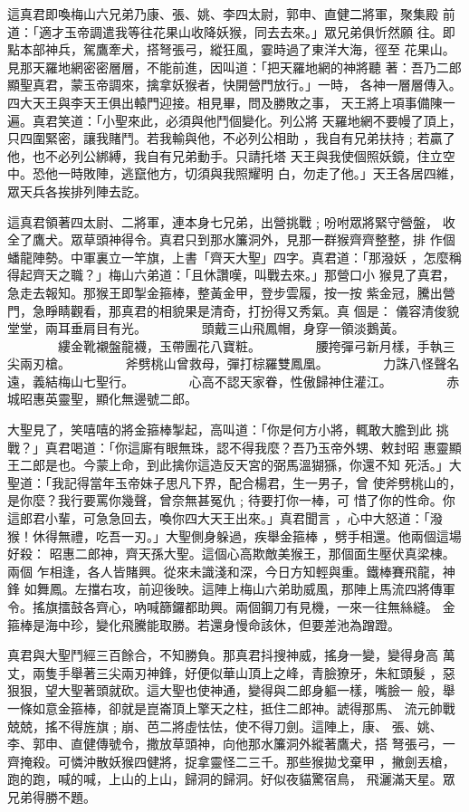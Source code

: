 \begin{pinyinscope}
{這真君即喚梅山六兄弟乃康、張、姚、李四太尉，郭申、直健二將軍，聚集殿
前道：「適才玉帝調遣我等往花果山收降妖猴，同去去來。」眾兄弟俱忻然願
往。即點本部神兵，駕鷹牽犬，搭弩張弓，縱狂風，霎時過了東洋大海，徑至
花果山。見那天羅地網密密層層，不能前進，因叫道：「把天羅地網的神將聽
著：吾乃二郎顯聖真君，蒙玉帝調來，擒拿妖猴者，快開營門放行。」一時，
各神一層層傳入。四大天王與李天王俱出轅門迎接。相見畢，問及勝敗之事，
天王將上項事備陳一遍。真君笑道：「小聖來此，必須與他鬥個變化。列公將
天羅地網不要幔了頂上，只四圍緊密，讓我賭鬥。若我輸與他，不必列公相助
，我自有兄弟扶持﹔若贏了他，也不必列公綁縛，我自有兄弟動手。只請托塔
天王與我使個照妖鏡，住立空中。恐他一時敗陣，逃竄他方，切須與我照耀明
白，勿走了他。」天王各居四維，眾天兵各挨排列陣去訖。

這真君領著四太尉、二將軍，連本身七兄弟，出營挑戰﹔吩咐眾將緊守營盤，
收全了鷹犬。眾草頭神得令。真君只到那水簾洞外，見那一群猴齊齊整整，排
作個蟠龍陣勢。中軍裏立一竿旗，上書「齊天大聖」四字。真君道：「那潑妖
，怎麼稱得起齊天之職？」梅山六弟道：「且休讚嘆，叫戰去來。」那營口小
猴見了真君，急走去報知。那猴王即掣金箍棒，整黃金甲，登步雲履，按一按
紫金冠，騰出營門，急睜睛觀看，那真君的相貌果是清奇，打扮得又秀氣。真
個是：
儀容清俊貌堂堂，兩耳垂肩目有光。
　　　　頭戴三山飛鳳帽，身穿一領淡鵝黃。
　　　　縷金靴襯盤龍襪，玉帶團花八寶粧。
　　　　腰挎彈弓新月樣，手執三尖兩刃槍。
　　　　斧劈桃山曾救母，彈打棕羅雙鳳凰。
　　　　力誅八怪聲名遠，義結梅山七聖行。
　　　　心高不認天家眷，性傲歸神住灌江。
　　　　赤城昭惠英靈聖，顯化無邊號二郎。

大聖見了，笑嘻嘻的將金箍棒掣起，高叫道：「你是何方小將，輒敢大膽到此
挑戰？」真君喝道：「你這廝有眼無珠，認不得我麼？吾乃玉帝外甥、敕封昭
惠靈顯王二郎是也。今蒙上命，到此擒你這造反天宮的弼馬溫猢猻，你還不知
死活。」大聖道：「我記得當年玉帝妹子思凡下界，配合楊君，生一男子，曾
使斧劈桃山的，是你麼？我行要罵你幾聲，曾奈無甚冤仇﹔待要打你一棒，可
惜了你的性命。你這郎君小輩，可急急回去，喚你四大天王出來。」真君聞言
，心中大怒道：「潑猴！休得無禮，吃吾一刃。」大聖側身躲過，疾舉金箍棒
，劈手相還。他兩個這場好殺：
昭惠二郎神，齊天孫大聖。這個心高欺敵美猴王，那個面生壓伏真梁棟。兩個
乍相逢，各人皆賭興。從來未識淺和深，今日方知輕與重。鐵棒賽飛龍，神鋒
如舞鳳。左擋右攻，前迎後映。這陣上梅山六弟助威風，那陣上馬流四將傳軍
令。搖旗擂鼓各齊心，吶喊篩鑼都助興。兩個鋼刀有見機，一來一往無絲縫。
金箍棒是海中珍，變化飛騰能取勝。若還身慢命該休，但要差池為蹭蹬。

真君與大聖鬥經三百餘合，不知勝負。那真君抖搜神威，搖身一變，變得身高
萬丈，兩隻手舉著三尖兩刃神鋒，好便似華山頂上之峰，青臉獠牙，朱紅頭髮
，惡狠狠，望大聖著頭就砍。這大聖也使神通，變得與二郎身軀一樣，嘴臉一
般，舉一條如意金箍棒，卻就是崑崙頂上擎天之柱，抵住二郎神。諕得那馬、
流元帥戰兢兢，搖不得旌旗﹔崩、芭二將虛怯怯，使不得刀劍。這陣上，康、
張、姚、李、郭申、直健傳號令，撒放草頭神，向他那水簾洞外縱著鷹犬，搭
弩張弓，一齊掩殺。可憐沖散妖猴四健將，捉拿靈怪二三千。那些猴拋戈棄甲
，撇劍丟槍，跑的跑，喊的喊，上山的上山，歸洞的歸洞。好似夜貓驚宿鳥，
飛灑滿天星。眾兄弟得勝不題。

}
\end{pinyinscope}
